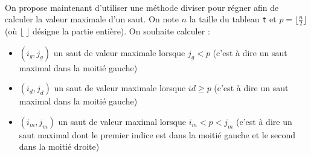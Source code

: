 \documentclass[11pt,a4paper]{article}
\begin{document}
\begin{Exercise}[title={Saut de valeur maximale}, origin={\bac {\sc capes nsi 2023}}]
  \ifcorrige
  \fi
  \ExePart[name = {Résolution avec une méthode diviser pour régner}]\\
	On propose maintenant d'utiliser une méthode diviser pour régner afin de calculer la valeur maximale d'un saut. On note $n$ la taille du tableau {\tt t} et $p = \lfloor \frac{n}{2} \rfloor$ (où $\lfloor \; \rfloor$ désigne la partie entière). On souhaite calculer :
	\begin{itemize}
		\item $(i_g,j_g)$ un saut de valeur maximale lorsque $j_g < p$ (c'est à dire un saut maximal dans la moitié gauche)
		\item $(i_d,j_d)$ un saut de valeur maximale lorsque $id \geqslant p$ (c'est à dire un saut maximal dans la moitié gauche)
		\item $(i_m,j_m)$ un saut de valeur maximal lorsque $i_m < p < j_m$ (c'est à dire un saut maximal dont le premier indice est dans la moitié gauche et le second dans la moitié droite)
	\end{itemize}


\end{Exercise}
\end{document}

